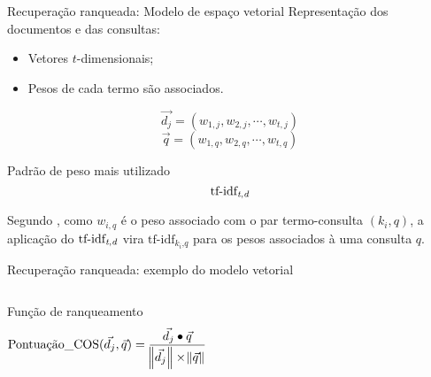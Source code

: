 \documentclass[%
  10pt,%
  aspectratio = 169,%
  compress,%
  t,%
]{beamer}%
\begin{document}
    \begin{frame}[fragile = singleslide]{}{Recuperação ranqueada: Modelo de espaço vetorial}
        Representação dos documentos e das consultas:
        \begin{itemize}
            \item Vetores $t$-dimensionais;
            \item Pesos de cada termo são associados.
        \end{itemize}
        \begin{equation}
            \label{eq:vetor-pesos-documento}
    		\vec{d_j} = (w_{1,j}, w_{2,j}, \cdots , w_{t,j})
        \end{equation}
        \begin{equation}
            \label{eq:vetor-pesos-consulta}
    		\vec{q} = (w_{1,q}, w_{2,q}, \cdots , w_{t,q})
        \end{equation}

        \begin{block}{Padrão de peso mais utilizado}
            \begin{equation}
                \text{tf-idf}_{\text{\textit{t},\textit{d}}}
            \end{equation}

            Segundo \cite[p.~77--78]{Baeza-Yates2011}, como $w_{i,q}$ é o peso associado com o par termo-consulta $(k_i, q)$, a aplicação do $\text{tf-idf}_{\text{\textit{t},\textit{d}}}$ vira $\text{tf-idf}_{k_i\text{,}\textit{q}}$ para os pesos associados à uma consulta $q$.
        \end{block}
    \end{frame}


    \begin{frame}[fragile = singleslide]{}{Recuperação ranqueada: exemplo do modelo vetorial}
        \begin{columns}[t]
            

            \vspace{1cm}
            \begin{block}{Função de ranqueamento}
            \begin{equation}
                \label{eq:pontuação-similaridade-cosseno}
        		\text{Pontuação\_COS}(\vec{d_j}, \vec{q}) = \frac{\vec{d_j} \bullet \vec{q} }{ \norm{\vec{d_j}} \times \norm{\vec{q}} }
            \end{equation}
            \end{block}
            \vspace{1cm}

        \end{columns}
    \end{frame}
\end{document}
